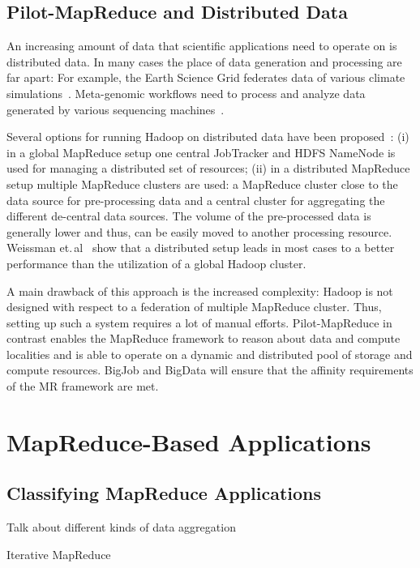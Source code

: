 \documentclass{acm_proc_article-sp}
\newcommand{\pilotmapreduce}{Pilot-MapReduce\xspace}
\begin{document}
\subsection{Pilot-MapReduce and Distributed Data}

An increasing amount of data that scientific applications need to operate on 
is distributed data. In many cases the place of data 
generation and processing are far apart: For example, the Earth Science Grid 
federates data of various climate simulations~\cite{ESG}. Meta-genomic 
workflows need to process and analyze data generated by various sequencing 
machines~\cite{Jha:2011fk}.

Several options for running Hadoop on distributed data have been
proposed~\cite{weissman-mr-11}: (i) in a global MapReduce setup one central
JobTracker and HDFS NameNode is used for managing a distributed set of
resources; (ii) in a distributed MapReduce setup multiple MapReduce clusters
are used: a MapReduce cluster close to the data source for pre-processing data
and a central cluster for aggregating the different de-central data sources.
The volume of the pre-processed data is generally lower and thus, can be
easily moved to another processing resource. Weissman
et.\,al~\cite{weissman-mr-11} show that a distributed setup leads in most
cases to a better performance than the utilization of a global Hadoop cluster.

A main drawback of this approach is the increased complexity: Hadoop is not 
designed with respect to a federation of multiple MapReduce cluster. Thus, 
setting up such a system requires a lot of manual efforts. \pilotmapreduce in 
contrast enables the MapReduce framework to reason about data and compute 
localities and is able to operate on a dynamic and distributed pool of storage 
and compute resources. BigJob and BigData will ensure that the affinity 
requirements of the MR framework are met.


\section{MapReduce-Based Applications}


\subsection{Classifying MapReduce Applications}

Talk about different kinds of data aggregation

Iterative MapReduce
\end{document}
